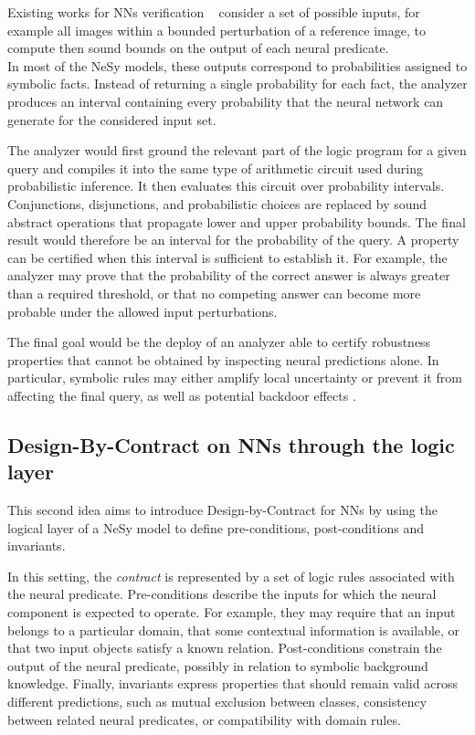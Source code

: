 \documentclass[11pt]{article}
\begin{document}
Existing works for NNs verification ~\cite{gehr2018ai} consider a set of possible inputs, for example all images within a bounded perturbation of a reference image, to compute then sound bounds on the output of each neural predicate. \\
In most of the NeSy models, these outputs correspond to probabilities assigned to symbolic facts. Instead of returning a single probability for each fact, the analyzer produces an interval containing every probability that the neural network can generate for the considered input set.

The analyzer would first ground the relevant part of the logic program for a given query and compiles it into the same type of arithmetic circuit used during probabilistic inference. It then evaluates this circuit over probability intervals. Conjunctions, disjunctions, and probabilistic choices are replaced by sound abstract operations that propagate lower and upper probability bounds. The final result would therefore be an interval for the probability of the query. A property can be certified when this interval is sufficient to establish it. For example, the analyzer may prove that the probability of the correct answer is always greater than a required threshold, or that no competing answer can become more probable under the allowed input perturbations.

The final goal would be the deploy of an analyzer able to certify robustness properties that cannot be obtained by inspecting neural predictions alone. In particular, symbolic rules may either amplify local uncertainty or prevent it from affecting the final query, as well as potential backdoor effects \cite{corallo2026doesreasoningmitigatebackdoor}.

\subsection{Design-By-Contract on NNs through the logic layer}
This second idea aims to introduce Design-by-Contract for NNs by using the logical layer of a NeSy model to define pre-conditions, post-conditions and invariants.

In this setting, the \textit{contract} is represented by a set of logic rules associated with the neural predicate. Pre-conditions describe the inputs for which the neural component is expected to operate. For example, they may require that an input belongs to a particular domain, that some contextual information is available, or that two input objects satisfy a known relation. Post-conditions constrain the output of the neural predicate, possibly in relation to symbolic background knowledge. Finally, invariants express properties that should remain valid across different predictions, such as mutual exclusion between classes, consistency between related neural predicates, or compatibility with domain rules.
\end{document}
